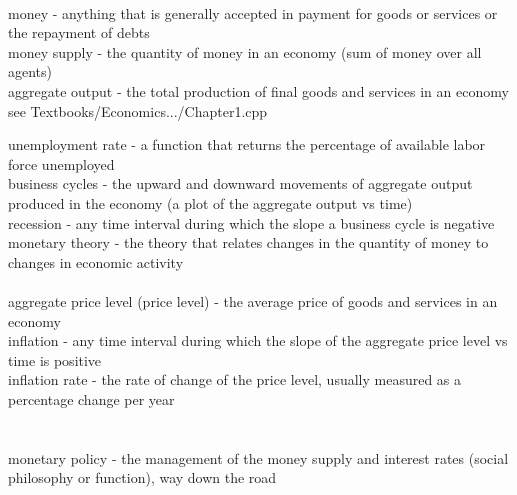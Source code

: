 \documentclass[12pt]{article}
\begin{document}
\\

\noindent money - anything that is generally accepted in payment for goods or services or the repayment of debts\\

\noindent money supply - the quantity of money in an economy (sum of money over all agents)\\

\noindent aggregate output - the total production of final goods and services in an economy\\
\noindent see Textbooks/Economics.../Chapter1.cpp

\noindent unemployment rate -  a function that returns the percentage of available labor force unemployed\\

\noindent business cycles - the upward and downward movements of aggregate output produced in the economy (a plot of the aggregate output vs time)\\

\noindent recession - any time interval during which the slope a business cycle is negative\\

\noindent monetary theory - the theory that relates changes in the quantity of money to changes in economic activity\\

\\

\noindent aggregate price level (price level) - the average price of goods and services in an economy\\

\noindent inflation - any time interval during which the slope of the aggregate price level vs time is positive\\

\noindent inflation rate - the rate of change of the price level, usually measured as a percentage change per year\\

\\

\\

\noindent monetary policy - the management of the money supply and interest rates (social philosophy or function), way down the road\\
\end{document}
